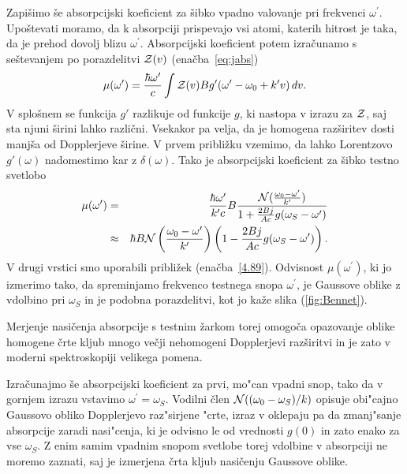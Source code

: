 Zapišimo še absorpcijski koeficient za šibko vpadno valovanje pri 
frekvenci $\omega^{\prime}$. Upoštevati moramo, da k absorpciji prispevajo vsi atomi, katerih
hitrost je taka, da je prehod dovolj blizu $\omega^{\prime}$. Absorpcijski 
koeficient potem izračunamo s seštevanjem 
po porazdelitvi ${\cal Z}(v)$
(enačba~\ref{eq:jabs})
\begin{equation}
\mu(\omega^{\prime})=\frac{\hbar\omega^{\prime}}{c}\int{\cal Z}(v)Bg'
(\omega^{\prime}-\omega_{0}+k'v)\, dv.
\label{4.90}
\end{equation}
V splošnem se funkcija $g'$ razlikuje od funkcije $g$, ki nastopa v izrazu za
${\cal Z}$, saj sta njuni širini lahko različni. Vsekakor pa velja, da je 
homogena razširitev dosti manjša od Dopplerjeve širine.
V prvem približku vzemimo, da lahko Lorentzovo $g'(\omega)$ nadomestimo kar z
$\delta(\omega)$. Tako je absorpcijski koeficient za šibko testno svetlobo 
\begin{eqnarray}
\mu(\omega^{\prime}) & = & \frac{\hbar\omega^{\prime}}{k'c}B\frac{{\cal N}
(\frac{\omega_0-\omega'}{k'})}{1+\frac{2Bj}{Ac}g(\omega_S-\omega')} \\ \nonumber 
 & \approx & \hbar B{\cal N}\left(\frac{\omega_0-\omega'}{k'}\right)\left(1-\frac{2Bj}{Ac}g(\omega_S-\omega')\right).
\end{eqnarray}
 V drugi vrstici smo uporabili približek (enačba~\ref{4.89}). Odvisnost $\mu(\omega^{\prime})$,
ki jo izmerimo tako, da spreminjamo frekvenco testnega snopa $\omega^{\prime}$,
je Gaussove oblike z vdolbino pri $\omega_S$ in je podobna porazdelitvi, 
kot jo kaže slika (\ref{fig:Bennet}). 

\begin{remark}
 Merjenje nasičenja absorpcije s testnim
žarkom torej omogoča opazovanje oblike homogene črte kljub mnogo večji
nehomogeni Dopplerjevi razširitvi in je zato v moderni spektroskopiji
velikega pomena.
\end{remark}

Izračunajmo še absorpcijski koeficient za prvi, mo"can vpadni snop, tako da v
gornjem izrazu vstavimo $\omega^{\prime}=\omega_S$. Vodilni člen ${\cal N}((\omega_0-
\omega_S)/k)$ opisuje obi"cajno Gaussovo obliko Dopplerjevo
raz"sirjene "crte, izraz v oklepaju pa da zmanj"sanje absorpcije
zaradi nasi"cenja, ki je odvisno le od vrednosti $g(0)$ in zato enako za vse $\omega_S$. 
Z enim samim vpadnim snopom svetlobe torej vdolbine v absorpciji ne moremo zaznati, saj 
je izmerjena črta kljub nasičenju Gaussove oblike. 

